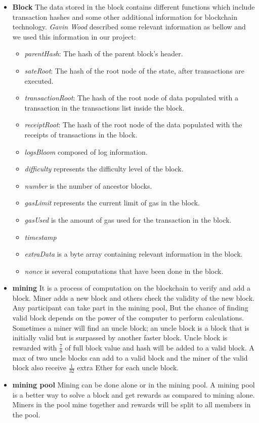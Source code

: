 \begin{itemize}
    \item \textbf{Block}
    The data stored in the block contains different functions which include transaction hashes and some other additional information for blockchain technology. \textit{Gavin Wood} described some relevant information as bellow and we used this information in our project: \\
    \begin{itemize}
        \item \textit{parentHash}: The hash of the parent block’s header.
        \item \textit{sateRoot}: The hash of the root node of the state, after transactions are executed.
        \item \textit{transactionRoot}: The hash of the root node of data populated with a transaction in the transactions list inside the block.
        \item \textit{receiptRoot}: The hash of the root node of the data populated with the receipts of transactions in the block.
        \item \textit{logsBloom} composed of log information.
        \item \textit{difficulty} represents the difficulty level of the block.
        \item \textit{number} is the number of ancestor blocks.
        \item \textit{gasLimit} represents the current limit of gas in the block.
        \item \textit{gasUsed} is the amount of gas used for the transaction in the block.
        \item \textit{timestamp}
        \item \textit{extraData} is a byte array containing relevant information in the block.
        \item \textit{nonce} is several computations that have been done in the block.
    \end{itemize}
    \item \textbf{mining}
    It is a process of computation on the blockchain to verify and add a block. Miner adds a new block and others check the validity of the new block. Any participant can take part in the mining pool, But the chance of finding valid block depends on the power of the computer to perform calculations. Sometimes a miner will find an uncle block; an uncle block is a block that is initially valid but is surpassed by another faster block. Uncle block is rewarded with $\frac{7}{8}$ of full block value and hash will be added to a valid block. A max of two uncle blocks can add to a valid block and the miner of the valid block also receive $\frac{1}{32}$ extra Ether for each uncle block\cite{Egbertsen}.
    \item \textbf{mining pool}
     Mining can be done alone or in the mining pool. A mining pool is a better way to solve a block and get rewards as compared to mining alone. Miners in the pool mine together and rewards will be split to all members in the pool\cite{Egbertsen}.
\end{itemize}
